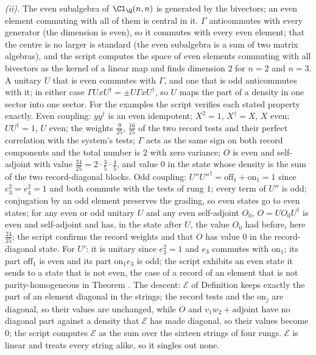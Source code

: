 \emph{(ii).} The even subalgebra of $\Cl_{\Q}(n,n)$ is generated by the bivectors; an even element commuting with all of them is central in it. $\Gamma$ anticommutes with every generator (the dimension is even), so it commutes with every even element; that the centre is no larger is standard (the even subalgebra is a sum of two matrix algebras), and the script computes the space of even elements commuting with all bivectors as the kernel of a linear map and finds dimension $2$ for $n = 2$ and $n = 3$. A unitary $U$ that is even commutes with $\Gamma$, and one that is odd anticommutes with it; in either case $\Gamma UxU^{\dagger} = \pm U\Gamma xU^{\dagger}$, so $U$ maps the part of a density in one sector into one sector. For the examples the script verifies each stated property exactly. Even coupling: $yy^{\dagger}$ is an even idempotent; $X^{2} = 1$, $X^{\dagger} = X$, $X$ even; $UU^{\dagger} = 1$, $U$ even; the weights $\tfrac{9}{25}$, $\tfrac{16}{25}$ of the two record tests and their perfect correlation with the system's tests; $\Gamma$ acts as the same sign on both record components and the total number is $2$ with zero variance; $O$ is even and self-adjoint with value $\tfrac{24}{25} = 2 \cdot \tfrac35 \cdot \tfrac45$, and value $0$ in the state whose density is the sum of the two record-diagonal blocks. Odd coupling: $U''U''^{\dagger} = \mathrm{off}_{1} + \mathrm{on}_{1} = 1$ since $e_{3}^{2} = e_{4}^{2} = 1$ and both commute with the tests of rung $1$; every term of $U''$ is odd; conjugation by an odd element preserves the grading, so even states go to even states; for any even or odd unitary $U$ and any even self-adjoint $O_{0}$, $O = UO_{0}U^{\dagger}$ is even and self-adjoint and has, in the state after $U$, the value $O_{0}$ had before, here $\tfrac{24}{25}$; the script confirms the record weights and that $O$ has value $0$ in the record-diagonal state. For $U'$: it is unitary since $e_{3}^{2} = 1$ and $e_{3}$ commutes with $\mathrm{on}_{1}$; its part $\mathrm{off}_{1}$ is even and its part $\mathrm{on}_{1}e_{3}$ is odd; the script exhibits an even state it sends to a state that is not even, the case of a record of an element that is not parity-homogeneous in Theorem . The descent: $\mathcal{E}$ of Definition  keeps exactly the part of an element diagonal in the strings; the record tests and the $\mathrm{on}_{j}$ are diagonal, so their values are unchanged, while $O$ and $v_{1}w_{2} + \text{adjoint}$ have no diagonal part against a density that $\mathcal{E}$ has made diagonal, so their values become $0$; the script computes $\mathcal{E}$ as the sum over the sixteen strings of four rungs. $\mathcal{E}$ is linear and treats every string alike, so it singles out none.

